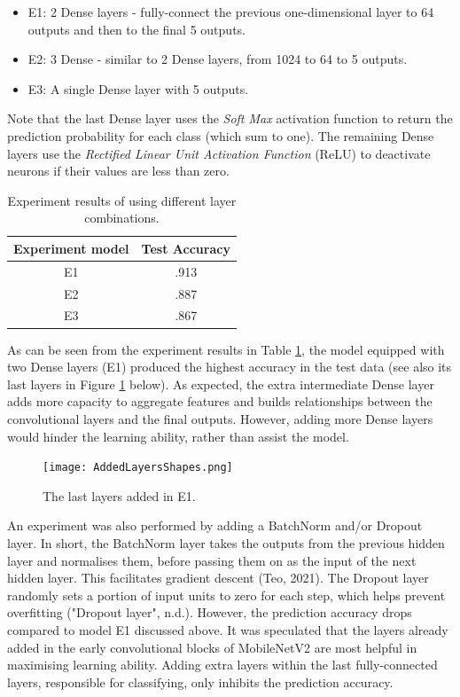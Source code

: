 \documentclass[]{article}
\begin{document}
\begin{itemize}
    \item E1: 2 Dense layers - fully-connect the previous one-dimensional layer to 64 outputs and then to the final 5 outputs.
    \item E2: 3 Dense - similar to 2 Dense layers, from 1024 to 64 to 5 outputs.
    \item E3: A single Dense layer with 5 outputs.   
\end{itemize}

Note that the last Dense layer uses the \textit{Soft Max} activation function to return the prediction probability for each class (which sum to one). The remaining Dense layers use the \textit{Rectified Linear Unit Activation Function} (ReLU) to deactivate neurons if their values are less than zero.

\begin{table}[H]
    \centering
    \begin{tabular}{ | c | c | }
     \hline
     Experiment model & Test Accuracy  \\ 
      \hline
        E1 & .913 \\  
      \hline
        E2 & .887 \\  
      \hline
        E3 & .867 \\  
      \hline
    \end{tabular}
    \caption{Experiment results of using different layer combinations.}
    \label{tab:LayerExperiments}
\end{table}

As can be seen from the experiment results in Table \ref{tab:LayerExperiments}, the model equipped with two Dense layers (E1) produced the highest accuracy in the test data (see also its last layers in Figure \ref{fig:Addedlayersshapes} below). As expected, the extra intermediate Dense layer adds more capacity to aggregate features and builds relationships between the convolutional layers and the final outputs. However, adding more Dense layers would hinder the learning ability, rather than assist the model.


\begin{figure}[H]
  \texttt{[image: AddedLayersShapes.png]}
  \centering
  \caption{The last layers added in E1.}
  \label{fig:Addedlayersshapes}
\end{figure}

An experiment was also performed by adding a BatchNorm and/or Dropout layer. In short, the BatchNorm layer takes the outputs from the previous hidden layer and normalises them, before passing them on as the input of the next hidden layer. This facilitates gradient descent (Teo, 2021). The Dropout layer randomly sets a portion of input units to zero for each step, which helps prevent overfitting ("Dropout layer", n.d.). However, the prediction accuracy drops compared to model E1 discussed above. It was speculated that the layers already added in the early convolutional blocks of MobileNetV2 are most helpful in maximising learning ability. Adding extra layers within the last fully-connected layers, responsible for classifying, only inhibits the prediction accuracy.
\end{document}
